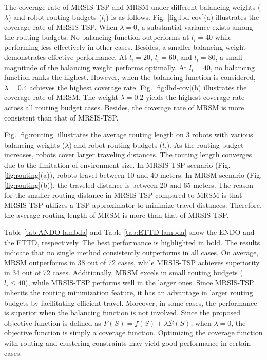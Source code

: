 The coverage rate of MRSIS-TSP\cite{li2024mrsis} and MRSM under different balancing weights ($\lambda$) and robot routing budgets ($l_i$) is as follows.
Fig. \ref{fig:lbd-cov}(a) illustrates the coverage rate of MRSIS-TSP\cite{li2024mrsis}.
When $\lambda=0$, a substantial variance exists among the routing budgets.
No balancing function outperforms at $l_i=40$ while performing less effectively in other cases.
Besides, a smaller balancing weight demonstrates effective performance.
At $l_i=20$, $l_i=60$, and $l_i=80$, a small magnitude of the balancing weight performs optimally.
At $l_i=40$, no balancing function ranks the highest. However, when the balancing function is considered, $\lambda=0.4$ achieves the highest coverage rate.
Fig. \ref{fig:lbd-cov}(b) illustrates the coverage rate of MRSM.
The weight $\lambda=0.2$ yields the highest coverage rate across all routing budget cases.
Besides, the coverage rate of MRSM is more consistent than that of MRSIS-TSP\cite{li2024mrsis}.

Fig. \ref{fig:routing} illustrates the average routing length on 3 robots with various balancing weights ($\lambda$) and robot routing budgets ($l_i$).
As the routing budget increases, robots cover larger traveling distances.
The routing length converges due to the limitation of environment size.
In MRSIS-TSP\cite{li2024mrsis} scenario (Fig. \ref{fig:routing}(a)), robots travel between 10 and 40 meters.
In MRSM scenario (Fig. \ref{fig:routing}(b)), the traveled distance is between 20 and 65 meters.
The reason for the smaller routing distance in MRSIS-TSP\cite{li2024mrsis} compared to MRSM is that MRSIS-TSP\cite{li2024mrsis} utilizes a TSP approximator to minimize travel distances.
Therefore, the average routing length of MRSM is more than that of MRSIS-TSP\cite{li2024mrsis}.

Table \ref{tab:ANDO-lambda} and Table \ref{tab:ETTD-lambda} show the ENDO and the ETTD, respectively.
The best performance is highlighted in bold.
The results indicate that no single method consistently outperforms in all cases.
On average, MRSM outperforms in 38 out of 72 cases, while MRSIS-TSP\cite{li2024mrsis} achieves superiority in 34 out of 72 cases.
Additionally, MRSM excels in small routing budgets ($l_i\leq40$), while MRSIS-TSP\cite{li2024mrsis} performs well in the larger ones.
Since MRSIS-TSP\cite{li2024mrsis} inherits the routing minimization feature, it has an advantage in larger routing budgets by facilitating efficient travel.
Moreover, in some cases, the performance is superior when the balancing function is not involved.
Since the proposed objective function is defined as $F(S)=f(S)+\lambda \mathcal{B}(S)$, when $\lambda=0$, the objective function is simply a coverage function.
Optimizing the coverage function with routing and clustering constraints may yield good performance in certain cases.

